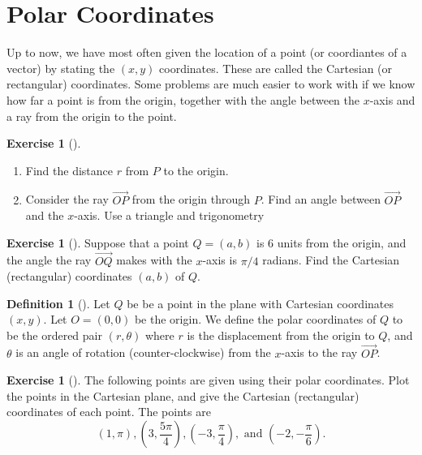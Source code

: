 \documentclass[10pt,]{book}
\theoremstyle{plain}
\theoremstyle{definition}
\newtheorem{definition}[theorem]{Definition}
\theoremstyle{definition}
\theoremstyle{definition}
\theoremstyle{definition}
\newtheorem{exploration}[project]{Exercise}
\theoremstyle{definition}
\numberwithin{equation}{section}
\newcommand{\ds}{\displaystyle}
\begin{document}
\section[{Polar Coordinates}]{Polar Coordinates}\label{section-13}
Up to now, we have most often given the location of a point (or coordiantes of a vector) by stating the \((x,y)\) coordinates. These are called the Cartesian (or rectangular) coordinates. Some problems are much easier to work with if we know how far a point is from the origin, together with the angle between the \(x\)-axis and a ray from the origin to the point.%
\begin{exploration}[]\label{exploration-83}
\leavevmode%
\begin{enumerate}[font=\bfseries,label=(\alph*),ref=\alph*]
\item\label{task-138} Find the distance \(r\) from \(P\) to the origin.%
\item\label{task-139} Consider the ray \(\stackrel{\rightarrow}{OP}\) from the origin through \(P\). Find an angle between \(\vec{OP}\) and the \(x\)-axis. Use a triangle and trigonometry%
%
\end{enumerate}
\end{exploration}
\begin{exploration}[]\label{exploration-84}
Suppose that a point \(Q=(a,b)\) is 6 units from the origin, and the angle the ray \(\vec{OQ}\) makes with the \(x\)-axis is \(\pi/4\) radians. Find the Cartesian (rectangular) coordinates \((a,b)\) of \(Q\).%
\end{exploration}
\begin{definition}[{}]\label{definition-21}
Let \(Q\) be be a point in the plane with Cartesian coordinates \((x,y)\). Let \(O=(0,0)\) be the origin. We define the polar coordinates of \(Q\) to be the ordered pair \((r,\theta)\) where \(r\) is the displacement from the origin to \(Q\), and \(\theta\) is an angle of rotation (counter-clockwise) from the \(x\)-axis to the ray \(\vec {OP}\).%
\end{definition}
\begin{exploration}[]\label{exploration-85}
The following points are given using their polar coordinates. Plot the points in the Cartesian plane, and give the Cartesian (rectangular) coordinates of each point. The points are%
\begin{equation*}
(1,\pi), 
\ds \left( 3,\frac{5\pi}{4}\right),
\ds \left( -3,\frac{\pi}{4}\right),\text{ and } 
\ds \left( -2,-\frac{\pi}{6}\right).
\end{equation*}
%
\end{exploration}
\end{document}
